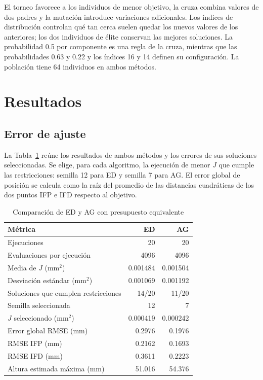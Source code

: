 \documentclass[conference,letterpaper]{IEEEtran}
\begin{document}
El torneo favorece a los individuos de menor objetivo, la cruza combina valores de dos padres y la mutación introduce variaciones adicionales. Los índices de distribución controlan qué tan cerca suelen quedar los nuevos valores de los anteriores; los dos individuos de élite conservan las mejores soluciones. La probabilidad 0.5 por componente es una regla de la cruza, mientras que las probabilidades 0.63 y 0.22 y los índices 16 y 14 definen su configuración. La población tiene 64 individuos en ambos métodos.

\section{Resultados}
\subsection{Error de ajuste}
La Tabla~\ref{tab:resultados} reúne los resultados de ambos métodos y los errores de sus soluciones seleccionadas. Se elige, para cada algoritmo, la ejecución de menor $J$ que cumple las restricciones: semilla 12 para ED y semilla 7 para AG. El error global de posición se calcula como la raíz del promedio de las distancias cuadráticas de los dos puntos IFP e IFD respecto al objetivo.

\begin{table}[t]
\caption{Comparación de ED y AG con presupuesto equivalente}
\label{tab:resultados}\centering\footnotesize
\begin{tabular}{lrr}\toprule Métrica & ED & AG\\\midrule
Ejecuciones &20&20\\ Evaluaciones por ejecución &4096&4096\\
Media de $J$ (mm$^2$)&0.001484&0.001504\\
Desviación estándar (mm$^2$)&0.001069&0.001192\\
Soluciones que cumplen restricciones&14/20&11/20\\\midrule
Semilla seleccionada&12&7\\
$J$ seleccionado (mm$^2$)&0.000419&0.000242\\
Error global RMSE (mm)&0.2976&0.1976\\
RMSE IFP (mm)&0.2162&0.1693\\
RMSE IFD (mm)&0.3611&0.2223\\
Altura estimada máxima (mm)&51.016&54.376\\\bottomrule
\end{tabular}
\end{table}
\end{document}

